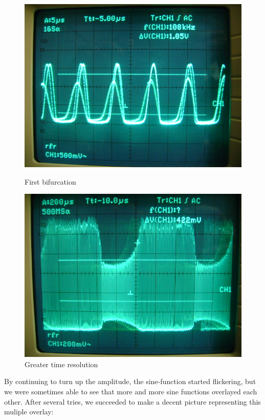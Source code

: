 \begin{figure}[H]
\begin{minipage}{0.5\textwidth}
\centering \includegraphics[width=\textwidth]{Fotos/01.JPG}
\caption{First bifurcation}
\end{minipage}
\begin{minipage}{0.5\textwidth}
\centering \includegraphics[width=\textwidth]{Fotos/02.JPG}
\caption{Greater time resolution}
\label{aaa}
\end{minipage}
\end{figure}

By continuing to turn up the amplitude, the sine-function started flickering, but we were sometimes able to see that more and more sine functions overlayed each other. After several tries, we succeeded to make a decent picture representing this muliple overlay:

